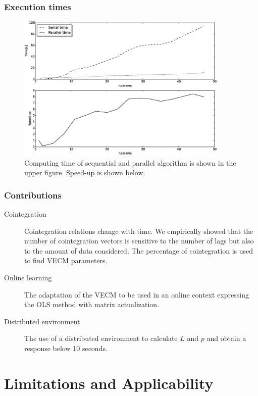 \documentclass{beamer}
\begin{document}
%
\begin{frame}
\frametitle{Execution times}
\begin{figure}[ht]
  \centering
  \includegraphics[width=0.9\textwidth]{img/51_Fig3}
  \caption[Computing time and Speed-up]{Computing time of sequential and parallel algorithm is shown in the
  upper figure. Speed-up is shown below.}
  \label{fig:extimes}
\end{figure}
\end{frame}

\begin{frame}
\frametitle{Contributions}
\begin{description}
\item[Cointegration]Cointegration relations change with time. We empirically showed that the number of cointegration vectors is sensitive to the number of lags but also to the amount of data considered. The percentage of cointegration is used to find VECM parameters.
\item[Online learning] The adaptation of the VECM to be used in an online context expressing the OLS method with matrix actualization.
\item[Distributed environment] The use of a distributed environment to calculate $L$ and $p$ and obtain a response below 10 seconds.
\end{description}
\end{frame}

\section{Limitations and Applicability}
\end{document}
